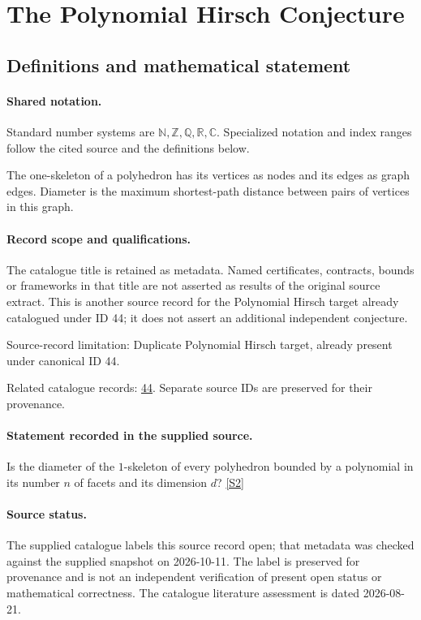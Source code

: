 \documentclass[11pt]{article}
\newcommand{\sref}[2]{\hyperlink{source:#1:#2}{[S#2]}}
\begin{document}
\section{The Polynomial Hirsch Conjecture}\label{statement}

\subsection{Definitions and mathematical statement}

\paragraph{Shared notation.}Standard number systems are $\mathbb N,\mathbb Z,\mathbb Q,\mathbb R,\mathbb C$. Specialized notation and index ranges follow the cited source and the definitions below.


The one-skeleton of a polyhedron has its vertices as nodes and its edges as graph edges. Diameter is the maximum shortest-path distance between pairs of vertices in this graph.
\paragraph{Record scope and qualifications.}
The catalogue title is retained as metadata. Named certificates, contracts, bounds or frameworks in that title are not asserted as results of the original source extract.
This is another source record for the Polynomial Hirsch target already catalogued under ID 44; it does not assert an additional independent conjecture.

Source-record limitation: Duplicate Polynomial Hirsch target, already present under canonical ID 44.

Related catalogue records: \href{https://mehmetmars7.github.io/Erdosproblems-llm-hunter/problem.html?type=open_problems&id=44}{44}. Separate source IDs are preserved for their provenance.
\paragraph{Statement recorded in the supplied source.}
Is the diameter of the $1$-skeleton of every polyhedron bounded by a polynomial in its number $n$ of facets and its dimension $d$? \sref{statement}{2}
\paragraph{Source status.}
The supplied catalogue labels this source record open; that metadata was checked against the supplied snapshot on 2026-10-11. The label is preserved for provenance and is not an independent verification of present open status or mathematical correctness. The catalogue literature assessment is dated 2026-08-21.
\end{document}
